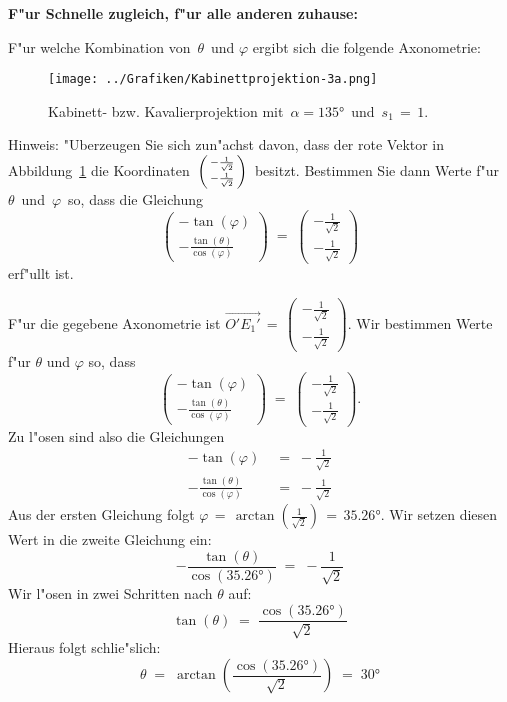 \begin{Aufgabe}
\textbf{F"ur Schnelle zugleich, f"ur alle anderen zuhause:}
\begin{Teilaufgaben}
\item F"ur welche Kombination von\, $\theta$\, und  $\varphi$ ergibt sich die folgende Axonometrie:
 \begin{figure}[ht]
  \centering
  \texttt{[image: ../Grafiken/Kabinettprojektion-3a.png]}
  \caption{Kabinett- bzw. Kavalierprojektion mit\, $\alpha = \ang{135}$\, und \,$s_1\, =\,1$.}
  \label{Kabinettproj}
  \end{figure}

  Hinweis: "Uberzeugen Sie sich zun"achst davon, dass der rote Vektor in Abbildung~\ref{Kabinettproj} die Koordinaten\, $\begin{psmallmatrix} - \frac{1}{\sqrt{2}}\\ - \frac{1}{\sqrt{2}} \end{psmallmatrix}$\, besitzt. Bestimmen Sie dann Werte f"ur\, $\theta$\, und\, $\varphi$\, so, dass die Gleichung \[\begin{pmatrix} - \tan(\varphi) \\ - \frac{\tan(\theta)}{\cos(\varphi)} \end{pmatrix}\;=\;\begin{pmatrix} - \frac{1}{\sqrt{2}}\\ - \frac{1}{\sqrt{2}} \end{pmatrix}\] erf"ullt ist.
\end{Teilaufgaben}
\end{Aufgabe}
\begin{Loesung}
\usetikzlibrary{calc}

	F"ur die gegebene Axonometrie ist $\overrightarrow{O'E_1'}\,=\,\begin{pmatrix}- \frac{1}{\sqrt{2}}\\- \frac{1}{\sqrt{2}}\end{pmatrix}$. Wir bestimmen Werte f"ur $\theta$ und $\varphi$ so, dass
	\[\begin{pmatrix}- \tan (\varphi)\\
	- \frac{\tan (\theta)}{\cos (\varphi)}\end{pmatrix}\;=\;\begin{pmatrix}- \frac{1}{\sqrt{2}}\\- \frac{1}{\sqrt{2}}\end{pmatrix}. 
	\] Zu l"osen sind also die Gleichungen \begin{align*}- \tan (\varphi)\;&=\;- \frac{1}{\sqrt{2}}\\ 
	- \frac{\tan (\theta)}{\cos (\varphi)}\;&=\;- \frac{1}{\sqrt{2}}
	\end{align*} Aus der ersten Gleichung folgt $\varphi\,=\,\arctan\left(\frac{1}{\sqrt{2}}\right)\,=\,\ang{35.26}$. Wir setzen diesen Wert in die zweite Gleichung ein: 
	\[- \frac{\tan (\theta)}{\cos \left(\ang{35.26}\right)}\;=\;- \frac{1}{\sqrt{2}}\] Wir l"osen in zwei Schritten nach $\theta$ auf: 
	\[\tan (\theta)\;=\;\frac{\cos \left(\ang{35.26}\right)}{\sqrt{2}}\] Hieraus folgt schlie"slich:
	\[\theta\;=\;\arctan\left(\frac{\cos \left(\ang{35.26}\right)}{\sqrt{2}}\right)\;=\;\ang{30}
	\]
\end{Loesung}